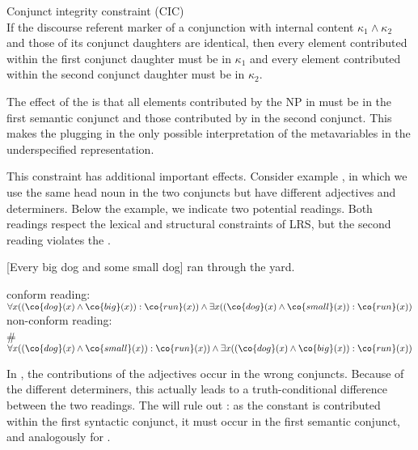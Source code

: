 \documentclass[output=paper]{langsci/langscibook}
\begin{document}
\ea \label{CCB}
Conjunct integrity constraint (CIC)\\
If the discourse referent marker of a conjunction with internal content $\kappa_1 \land \kappa_2$ and those of its conjunct daughters are identical, then every element contributed within the first conjunct daughter must be in $\kappa_1$ and every element contributed within the second conjunct daughter must be in $\kappa_2$.
\z

The effect of the \CCB{} is that all elements contributed by the NP  in  must be in the first semantic conjunct and those contributed by  in the second conjunct. This makes the plugging in  the only possible interpretation of the metavariables in the underspecified representation.

This constraint has additional important effects. 
Consider example , in which we use the same head noun in the two conjuncts but have different adjectives and determiners. 
Below the example, we indicate two potential readings. 
Both readings respect the lexical and structural constraints of LRS, but the second reading violates the \CCB.\largerpage[2]

\ea \label{ex-QANQAN}
{}[Every big dog and some 
small dog] ran through the yard.%
\begin{xlist}
\ex \CCB{} conform reading:\label{ex-CIC-ok}\\ 
$\forall x ((\co{dog}(x) \land \co{big}(x)) : \co{run}(x)) 
\land 
\exists x ((\co{dog}(x) \land \co{small}(x)): \co{run}(x))
$
\ex  \CCB{} non-conform reading:\label{ex-CIC-ko}\\ 
\# $
\forall x ((\co{dog}(x) \land \co{small}(x)) : \co{run}(x))
\land 
\exists x ((\co{dog}(x) \land \co{big}(x)) :  \co{run}(x))
$
\end{xlist}
\z 

In , the contributions of the adjectives occur in the wrong conjuncts.
Because of the different determiners, this actually leads to a truth-conditional difference between the two readings. The \CCB{} will rule out : as the constant  is contributed within the first syntactic conjunct, it must occur in the first semantic conjunct, and analogously for .
\end{document}
